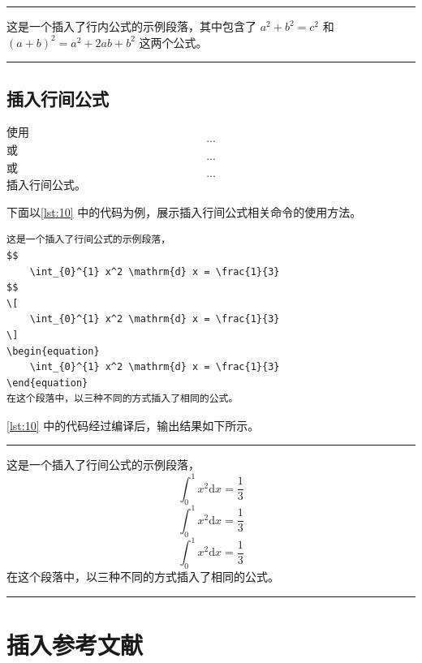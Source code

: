 \documentclass[a4paper]{article}
\begin{document}
\vspace{0.75cm}
\hrule
\vspace{0.25cm}

这是一个插入了行内公式的示例段落，其中包含了 $a^2 + b^2 = c^2$ 和  \((a+b)^2 = a^2 + 2ab + b^2\) 这两个公式。

\vspace{0.25cm}
\hrule
\vspace{0.25cm}

\subsection{插入行间公式}

使用 \texttt{$$...$$} 或 \texttt{\[...\]} 或 \texttt{\begin{equation}...\end{equation}} 插入行间公式。

下面以\cref{lst:10} 中的代码为例，展示插入行间公式相关命令的使用方法。

\begin{center}
    \label{lst:10}
    \begin{verbatim}
这是一个插入了行间公式的示例段落，
$$
    \int_{0}^{1} x^2 \mathrm{d} x = \frac{1}{3}
$$
\[
    \int_{0}^{1} x^2 \mathrm{d} x = \frac{1}{3}
\]
\begin{equation}
    \int_{0}^{1} x^2 \mathrm{d} x = \frac{1}{3}
\end{equation}
在这个段落中，以三种不同的方式插入了相同的公式。
    \end{verbatim}
\end{center}

\cref{lst:10} 中的代码经过编译后，输出结果如下所示。

\vspace{0.75cm}
\hrule
\vspace{0.25cm}

这是一个插入了行间公式的示例段落，
$$
    \int_{0}^{1} x^2 \mathrm{d} x = \frac{1}{3}
$$
\[
    \int_{0}^{1} x^2 \mathrm{d} x = \frac{1}{3}
\]
\begin{equation}
    \int_{0}^{1} x^2 \mathrm{d} x = \frac{1}{3}
\end{equation}
在这个段落中，以三种不同的方式插入了相同的公式。

\vspace{0.25cm}
\hrule
\vspace{0.25cm}

\section{插入参考文献}
\end{document}
